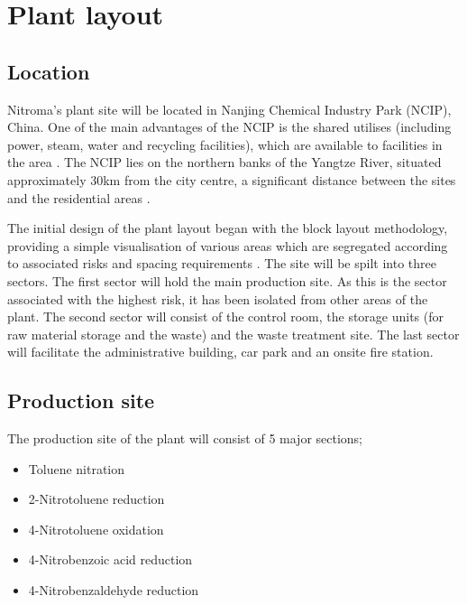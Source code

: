 \section{Plant layout}

\subsection{Location}

Nitroma’s plant site will be located in Nanjing Chemical Industry Park (NCIP), China. One of the main advantages of the NCIP is the shared utilises (including power, steam, water and recycling facilities), which are available to facilities in the area \cite{independent_commodity_intelligence_services_china_2007}. The NCIP lies on the northern banks of the Yangtze River, situated approximately 30km from the city centre, a significant distance between the sites and the residential areas \cite{zeng_divergent_2011}.   


The initial design of the plant layout began with the block layout methodology, providing a simple visualisation of various areas which are segregated according to associated risks and spacing requirements \cite{center_for_chemical_process_safety_site_2010}. The site will be spilt into three sectors. The first sector will hold the main production site. As this is the sector associated with the highest risk, it has been isolated from other areas of the plant. The second sector will consist of the control room, the storage units (for raw material storage and the waste) and the waste treatment site. The last sector will facilitate the administrative building, car park and an onsite fire station.

\subsection{Production site}

The production site of the plant will consist of 5 major sections; 

\begin{itemize}
    \item Toluene nitration
    \item 2-Nitrotoluene reduction 
    \item 4-Nitrotoluene oxidation 
    \item 4-Nitrobenzoic acid reduction 
    \item 4-Nitrobenzaldehyde reduction 
\end{itemize}

